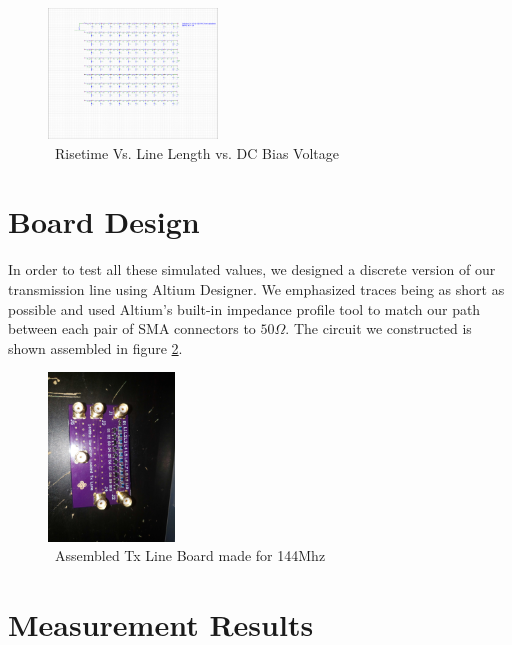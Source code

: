 \documentclass[journal]{IEEEtran} \usepackage[english]{babel}
\begin{document}
\begin{figure}[htb]
\centering
\includegraphics[width=0.4\textwidth,page = {3}]{RiseTimeVsDCBIASVsLength.pdf}
\caption{\ Risetime Vs. Line Length vs. DC Bias Voltage 
}\label{fig:RiseVsLineVsBias}
\end{figure}






\section{Board Design} 


In order to test all these simulated values, we designed a discrete version of
our transmission line using Altium Designer. We emphasized traces being as short
as possible and used Altium's built-in impedance profile tool to match our path
between each pair of SMA connectors to $50\Omega$. The circuit we constructed is
shown assembled in figure \ref{fig:assembled}.


\begin{figure}[htb]
\centering
\includegraphics[width=0.3\textwidth, angle = 90]{AssembledBoard.jpg}
\caption{\ Assembled Tx Line Board made for 144Mhz
}\label{fig:assembled}
\end{figure}





\section{ Measurement Results }
\end{document}
